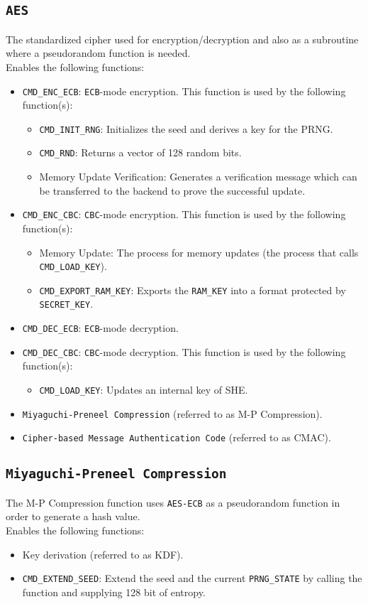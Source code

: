 \documentclass{article}
\begin{document}
	\subsection{\texttt{AES}}	
	The standardized cipher used for encryption/decryption and also as a subroutine where a pseudorandom function is needed.\\
	Enables the following functions:
	\begin{itemize}
		\item \texttt{CMD\_ENC\_ECB}: \texttt{ECB}-mode encryption. This function is used by the following function(s):
		\begin{itemize}
			\item \texttt{CMD\_INIT\_RNG}: Initializes the seed and derives a key for the PRNG.
			\item \texttt{CMD\_RND}: Returns a vector of 128 random bits.
			\item Memory Update Verification: Generates a verification message which can be transferred to the backend to prove the successful update.
		\end{itemize}
		\item \texttt{CMD\_ENC\_CBC}: \texttt{CBC}-mode encryption. This function is used by the following function(s):
		\begin{itemize}
			\item Memory Update: The process for memory updates (the process that calls \texttt{CMD\_LOAD\_KEY}).
			\item \texttt{CMD\_EXPORT\_RAM\_KEY}: Exports the \texttt{RAM\_KEY} into a format protected by \texttt{SECRET\_KEY}.
		\end{itemize}
		\item \texttt{CMD\_DEC\_ECB}: \texttt{ECB}-mode decryption.
		\item \texttt{CMD\_DEC\_CBC}: \texttt{CBC}-mode decryption. This function is used by the following function(s):
		\begin{itemize}
			\item \texttt{CMD\_LOAD\_KEY}: Updates an internal key of SHE.
		\end{itemize}
		\item \texttt{Miyaguchi-Preneel Compression} (referred to as M-P Compression).
		\item \texttt{Cipher-based Message Authentication Code} (referred to as CMAC).
	\end{itemize}
	
	\subsection{\texttt{Miyaguchi-Preneel Compression}}
	The M-P Compression function uses \texttt{AES-ECB} as a pseudorandom function in order to generate a hash value. \\
	Enables the following functions:
	\begin{itemize}
		\item Key derivation (referred to as KDF).
		\item \texttt{CMD\_EXTEND\_SEED}: Extend the seed and the current \texttt{PRNG\_STATE} by calling the function and supplying 128 bit of entropy.
	\end{itemize}
\end{document}
